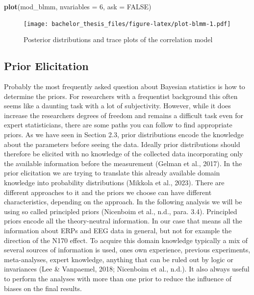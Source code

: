 \documentclass[
  doc,12pt,floatsintext]{apa7}
\newenvironment{Shaded}{\begin{snugshade}}{\end{snugshade}}
\newcommand{\AttributeTok}[1]{\textcolor[rgb]{0.13,0.29,0.53}{#1}}
\newcommand{\ConstantTok}[1]{\textcolor[rgb]{0.56,0.35,0.01}{#1}}
\newcommand{\DecValTok}[1]{\textcolor[rgb]{0.00,0.00,0.81}{#1}}
\newcommand{\FunctionTok}[1]{\textcolor[rgb]{0.13,0.29,0.53}{\textbf{#1}}}
\newcommand{\NormalTok}[1]{#1}
\begin{document}
\begin{Shaded}
\begin{Highlighting}[]
\FunctionTok{plot}\NormalTok{(mod\_blmm, }\AttributeTok{nvariables =} \DecValTok{6}\NormalTok{, }\AttributeTok{ask =} \ConstantTok{FALSE}\NormalTok{)}
\end{Highlighting}
\end{Shaded}

\begin{figure}
\centering
\texttt{[image: bachelor\_thesis\_files/figure-latex/plot-blmm-1.pdf]}
\caption{\label{fig:plot-blmm}Posterior distributions and trace plots of the correlation model}
\end{figure}

\subsection{Prior Elicitation}\label{prior-elicitation}

Probably the most frequently asked question about Bayesian statistics is how to determine the priors. For researchers with a frequentist background this often seems like a daunting task with a lot of subjectivity. However, while it does increase the researchers degrees of freedom and remains a difficult task even for expert statisticians, there are some paths you can follow to find appropriate priors. As we have seen in Section 2.3, prior distributions encode the knowledge about the parameters before seeing the data. Ideally prior distributions should therefore be elicited with no knowledge of the collected data incorporating only the available information before the measurement (Gelman et al., 2017). In the prior elicitation we are trying to translate this already available domain knowledge into probability distributions (Mikkola et al., 2023). There are different approaches to it and the priors we choose can have different characteristics, depending on the approach. In the following analysis we will be using so called principled priors (Nicenboim et al., n.d., para. 3.4). Principled priors encode all the theory-neutral information. In our case that means all the information about ERPs and EEG data in general, but not for example the direction of the N170 effect. To acquire this domain knowledge typically a mix of several sources of information is used, ones own experience, previous experiments, meta-analyses, expert knowledge, anything that can be ruled out by logic or invariances (Lee \& Vanpaemel, 2018; Nicenboim et al., n.d.). It also always useful to perform the analyses with more than one prior to reduce the influence of biases on the final results.
\end{document}
